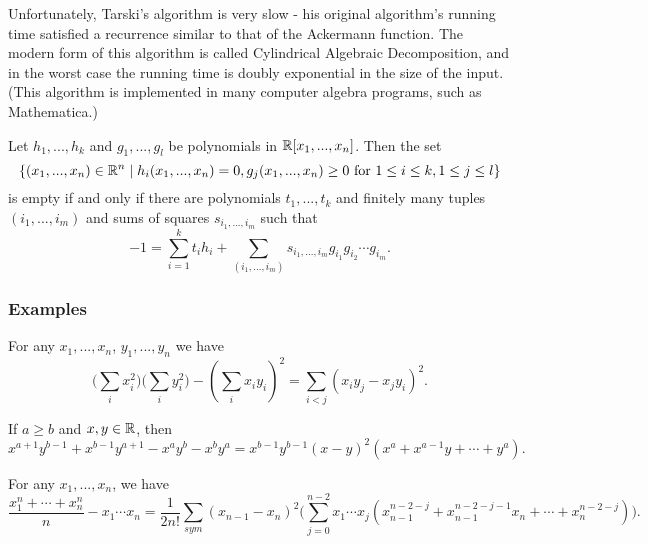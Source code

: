 \begin{rem} Unfortunately, Tarski's algorithm is very slow - his original algorithm's running time satisfied a recurrence similar to that of the Ackermann function. The modern form of this algorithm is called Cylindrical Algebraic Decomposition, and in the worst case the running time is doubly exponential in the size of the input. (This algorithm is implemented in many computer algebra programs, such as Mathematica.)
\end{rem}

\begin{thm} Let $h_1, ..., h_k$ and $g_1, ..., g_l$ be polynomials in $\mathbb{R}[x_1, ..., x_n]$. Then the set
\[
\{(x_1, ..., x_n)\in\mathbb{R}^n\mid h_i(x_1, ..., x_n) = 0, g_j(x_1, ..., x_n) \ge 0 \mbox{ for } 1\le i \le k, 1\le j \le l\}
\]
is empty if and only if there are polynomials $t_1, ..., t_k$ and finitely many tuples $(i_1, ..., i_m)$ and sums of squares $s_{i_1, ..., i_m}$ such that
\[
-1 = \sum_{i=1}^k t_ih_i + \sum_{(i_1, ..., i_m)} s_{i_1, ..., i_m}g_{i_1}g_{i_2}\cdots g_{i_m}.
\]
\end{thm}

\subsubsection{Examples}

\begin{prop} For any $x_1, ..., x_n$, $y_1, ..., y_n$ we have
\[
\Big(\sum_i x_i^2\Big)\Big(\sum_i y_i^2\Big) - \left(\sum_i x_iy_i\right)^2 = \sum_{i<j} (x_iy_j-x_jy_i)^2.
\]
\end{prop}

\begin{prop} If $a\ge b$ and $x,y\in \mathbb{R}$, then
\[
x^{a+1}y^{b-1} + x^{b-1}y^{a+1} - x^ay^b - x^by^a = x^{b-1}y^{b-1}(x-y)^2(x^a + x^{a-1}y + \cdots + y^a).
\]
\end{prop}

\begin{prop}[AM-GM] For any $x_1, ..., x_n$, we have
\[
\frac{x_1^n + \cdots + x_n^n}{n} - x_1\cdots x_n = \frac{1}{2n!} \sum_{sym} (x_{n-1}-x_n)^2\Big(\sum_{j=0}^{n-2} x_1\cdots x_j(x_{n-1}^{n-2-j} + x_{n-1}^{n-2-j-1}x_n + \cdots + x_n^{n-2-j})\Big).
\]
\end{prop}

